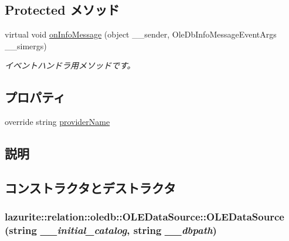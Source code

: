 \subsection*{Protected メソッド}
\begin{DoxyCompactItemize}
\item 
virtual void \hyperlink{classlazurite_1_1relation_1_1oledb_1_1_o_l_e_data_source_af993859278174a7c0a6117ab7b7f4a2a}{onInfoMessage} (object \_\-\_\-sender, OleDbInfoMessageEventArgs \_\-\_\-simergs)
\begin{DoxyCompactList}\small\item\em イベントハンドラ用メソッドです。 \item\end{DoxyCompactList}\end{DoxyCompactItemize}
\subsection*{プロパティ}
\begin{DoxyCompactItemize}
\item 
override string \hyperlink{classlazurite_1_1relation_1_1oledb_1_1_o_l_e_data_source_a69a5bde74764439a3b30a1e7787339ce}{providerName}
\end{DoxyCompactItemize}


\subsection{説明}


\subsection{コンストラクタとデストラクタ}
\hypertarget{classlazurite_1_1relation_1_1oledb_1_1_o_l_e_data_source_a8553c36006714e8f6a80cd8696edd390}{
\subsubsection[{OLEDataSource}]{\setlength{\rightskip}{0pt plus 5cm}lazurite::relation::oledb::OLEDataSource::OLEDataSource (string {\em \_\-\_\-initial\_\-catalog}, \/  string {\em \_\-\_\-dbpath})}}
\label{classlazurite_1_1relation_1_1oledb_1_1_o_l_e_data_source_a8553c36006714e8f6a80cd8696edd390}

